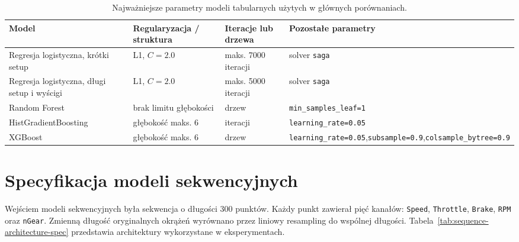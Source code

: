 \documentclass[printmode,pl]{mgr}
\begin{document}
\begin{table}[H]
\centering
\footnotesize
\setlength{\tabcolsep}{5pt}
\renewcommand{\arraystretch}{1.2}
\begin{tabularx}{\textwidth}{%
  >{\raggedright\arraybackslash}p{3.5cm}%
  >{\raggedright\arraybackslash}p{2.5cm}%
  >{\raggedright\arraybackslash}p{2.6cm}%
  >{\raggedright\arraybackslash}X}
\toprule
Model & Regularyzacja / struktura & Iteracje lub drzewa & Pozostałe parametry \\
\midrule
Regresja logistyczna, krótki setup & L1, \(C=2.0\) & maks. 7000 iteracji & solver \texttt{saga} \\
Regresja logistyczna, długi setup i wyścigi & L1, \(C=2.0\) & maks. 5000 iteracji & solver \texttt{saga} \\
Random Forest & brak limitu głębokości & 400 drzew & \texttt{min\_samples\_leaf=1} \\
Hist\-Gradient\-Boosting & głębokość maks. 6 & 300 iteracji & \texttt{learning\_rate=0.05} \\
XGBoost & głębokość maks. 6 & 300 drzew & \texttt{learning\_rate=0.05},\newline \texttt{subsample=0.9},\newline \texttt{colsample\_bytree=0.9} \\
\bottomrule
\end{tabularx}
\caption{Najważniejsze parametry modeli tabularnych użytych w głównych porównaniach.}
\label{tab:tabular-model-params}
\end{table}

\section{Specyfikacja modeli sekwencyjnych}

Wejściem modeli sekwencyjnych była sekwencja o długości 300 punktów. Każdy punkt zawierał pięć kanałów: \texttt{Speed}, \texttt{Throttle}, \texttt{Brake}, \texttt{RPM} oraz \texttt{nGear}. Zmienną długość oryginalnych okrążeń wyrównano przez liniowy resampling do wspólnej długości. Tabela~\ref{tab:sequence-architecture-spec} przedstawia architektury wykorzystane w eksperymentach.
\end{document}
